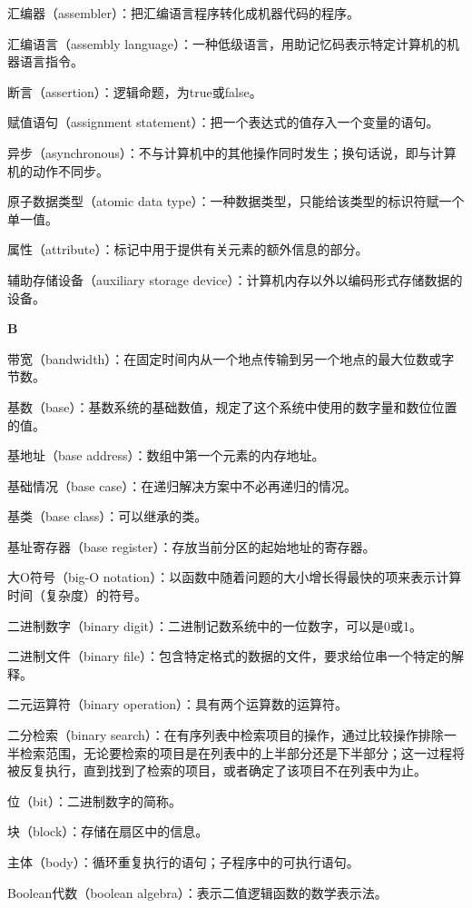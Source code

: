 汇编器（assembler）：把汇编语言程序转化成机器代码的程序。

汇编语言（assembly language）：一种低级语言，用助记忆码表示特定计算机的机器语言指令。

断言（assertion）：逻辑命题，为true或false。

赋值语句（assignment statement）：把一个表达式的值存入一个变量的语句。

异步（asynchronous）：不与计算机中的其他操作同时发生；换句话说，即与计算机的动作不同步。

原子数据类型（atomic data type）：一种数据类型，只能给该类型的标识符赋一个单一值。

属性（attribute）：标记中用于提供有关元素的额外信息的部分。

辅助存储设备（auxiliary storage device）：计算机内存以外以编码形式存储数据的设备。

\textbf{B}

带宽（bandwidth）：在固定时间内从一个地点传输到另一个地点的最大位数或字节数。

基数（base）：基数系统的基础数值，规定了这个系统中使用的数字量和数位位置的值。

基地址（base address）：数组中第一个元素的内存地址。

基础情况（base case）：在递归解决方案中不必再递归的情况。

基类（base class）：可以继承的类。

基址寄存器（base register）：存放当前分区的起始地址的寄存器。

大O符号（big-O notation）：以函数中随着问题的大小增长得最快的项来表示计算时间（复杂度）的符号。

二进制数字（binary digit）：二进制记数系统中的一位数字，可以是0或1。

二进制文件（binary file）：包含特定格式的数据的文件，要求给位串一个特定的解释。

二元运算符（binary operation）：具有两个运算数的运算符。

二分检索（binary search）：在有序列表中检索项目的操作，通过比较操作排除一半检索范围，无论要检索的项目是在列表中的上半部分还是下半部分；这一过程将被反复执行，直到找到了检索的项目，或者确定了该项目不在列表中为止。

位（bit）：二进制数字的简称。

块（block）：存储在扇区中的信息。

主体（body）：循环重复执行的语句；子程序中的可执行语句。

Boolean代数（boolean algebra）：表示二值逻辑函数的数学表示法。

